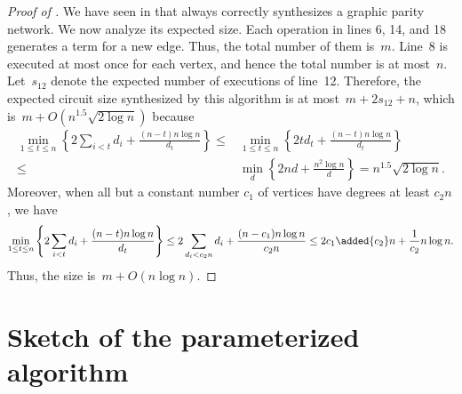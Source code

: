 \documentclass[a4paper,cleveref, autoref, 11pt, fleqn, thm-restate]{article}
\theoremstyle{plain}
\begin{document}
\begin{proof}[Proof of ]
  We have seen in  that  always correctly synthesizes a graphic parity network.  We now analyze its expected size.
  Each operation in lines 6, 14, and 18 generates a term for a new edge.  Thus, the total number of them is~$m$.
  Line~8 is executed at most once for each vertex, and hence the total number is at most~$n$.
  Let~$s_{12}$ denote the expected number of executions of line~12.
  Therefore, the expected circuit size synthesized by this algorithm is at most~$m + 2 s_{12}+ n$, which is~$m + O(n^{1.5}\sqrt{2\log n})$ because
  \[
    \begin{aligned}
      \min_{1\le t\le n}\left\{2\sum_{i< t}d_i+\frac{(n-t)n\log n}{d_{t}}\right\} \le & \min_{1\le t\le n}\left\{2td_t+\frac{(n-t)n\log n}{d_{t}}\right\}         \\
      \le                                                                             & \min_d \left\{2nd+\frac {n^2\log n}{d}  \right\} = n^{1.5}\sqrt{2\log n}.
    \end{aligned}
  \]
  Moreover, when all but a constant number $c_1$ of vertices have degrees at least $c_2n$, we have
  \[
    \min_{1\le t\le n}\left\{2\sum_{i< t}d_i+\frac{(n-t)n\log n}{d_{t}}\right\} \le  2\sum_{d_i<c_2n} d_i + \frac {(n-c_1)n\log n}{c_2n}
    \le  2c_1\added{c_2}n+ \frac 1{c_2}n\log n.
  \]
  Thus, the size is~$m + O(n\log n)$.
\end{proof}


\section{Sketch of the parameterized algorithm}\label{app:fpt-recg}
\end{document}

